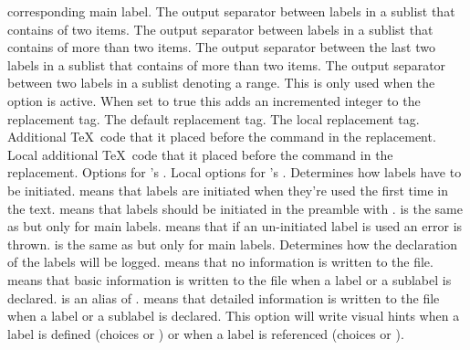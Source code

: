 \documentclass[load-preamble+,babel-options={ngerman,british,american}]{cnltx-doc}
\begin{document}
\begin{options}
    corresponding main label.
  \Default{,}
    The output separator between labels in a sublist that contains of two
    items.
  \Default{,}
    The output separator between labels in a sublist that contains of more
    than two items.
  \Default{,}
    The output separator between the last two labels in a sublist that
    contains of more than two items.
  \Default{--}
    The output separator between two labels in a sublist denoting a range.
    This is only used when the option  is active.
    When set to true this adds an incremented integer to the replacement tag.
    The default replacement tag.
    The local replacement tag.
    Additional \TeX\ code that it placed before the  command in the
    replacement.
    Local additional \TeX\ code that it placed before the  command in
    the replacement.
    Options for 's .
    Local options for 's .
    Determines how labels have to be initiated.   means that
    labels are initiated when they're used the first time in the text.
     means that labels should be initiated in the preamble with
    .   is the same as  but only for main
    labels.   means that if an un-initiated label is used an
    error is thrown.   is the same as  but only
    for main labels.
    Determines how the declaration of the labels will be logged.  
    means that no information is written to the  file.  
    means that basic information is written to the  file when a
    label or a sublabel is declared.   is an alias of
    .   means that detailed information is written to
    the  file when a label or a sublabel is declared.
    This option will write visual hints when a label is defined (choices
     or ) or when a label is referenced (choices
     or ).
\end{options}
\end{document}
